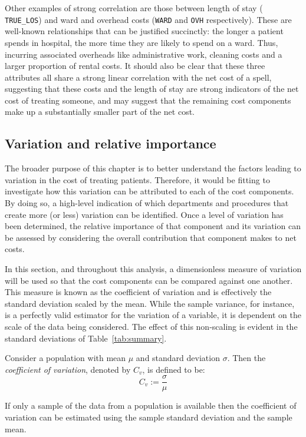 Other examples of strong correlation are those between length of stay ({\tt
TRUE\_LOS}) and ward and overhead costs ({\tt WARD} and {\tt OVH} respectively).
These are well-known relationships that can be justified succinctly: the longer
a patient spends in hospital, the more time they are likely to spend on a ward.
Thus, incurring associated overheads like administrative work, cleaning costs
and a larger proportion of rental costs. It should also be clear that these
three attributes all share a strong linear correlation with the net cost of a
spell, suggesting that these costs and the length of stay are strong indicators
of the net cost of treating someone, and may suggest that the remaining cost
components make up a substantially smaller part of the net cost.


\subsection{Variation and relative importance}

The broader purpose of this chapter is to better understand the factors leading
to variation in the cost of treating patients. Therefore, it would be fitting to
investigate how this variation can be attributed to each of the cost components.
By doing so, a high-level indication of which departments and procedures that
create more (or less) variation can be identified. Once a level of variation has
been determined, the relative importance of that component and its variation can
be assessed by considering the overall contribution that component makes to net
costs.

In this section, and throughout this analysis, a dimensionless measure of
variation will be used so that the cost components can be compared against one
another. This measure is known as the coefficient of variation and is
effectively the standard deviation scaled by the mean. While the sample
variance, for instance, is a perfectly valid estimator for the variation of a
variable, it is dependent on the scale of the data being considered. The effect
of this non-scaling is evident in the standard deviations of
Table~\ref{tab:summary}.

\begin{definition}
    Consider a population with mean \(\mu\) and standard deviation \(\sigma\).
    Then the \emph{coefficient of variation}, denoted by \(C_v\), is defined to
    be:
    \begin{equation}\label{eq:coeff_var}
        C_{v} := \frac{\sigma}{\mu}
    \end{equation}

    If only a sample of the data from a population is available then the
    coefficient of variation can be estimated using the sample standard
    deviation and the sample mean.
\end{definition}

